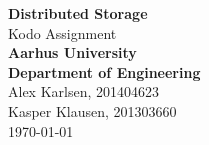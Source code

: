 \begin{titlepage}
    \begin{center}
        \vspace*{0cm}
        \Huge\textbf{Distributed Storage}\\
        \vspace{0.5cm}
        \huge{Kodo Assignment}\\
        \vspace{1.5cm}
        \Large\textbf{{Aarhus University\\ Department of Engineering}}\\
        \vspace{0.5cm}
        \Large{Alex Karlsen, 201404623 \\  Kasper Klausen, 201303660}\\
        \vspace{0.5cm}
        \large{\today}
    \end{center}  
\end{titlepage}